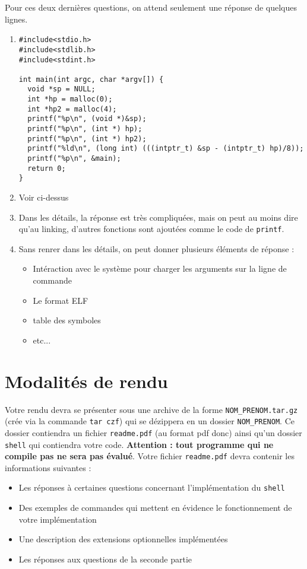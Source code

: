 \documentclass[11pt]{article}
\begin{document}
Pour ces deux dernières questions, on attend seulement une réponse de quelques lignes.
\begin{solution}
  \begin{enumerate}
  \item
    \begin{verbatim}
#include<stdio.h>
#include<stdlib.h>
#include<stdint.h>

int main(int argc, char *argv[]) {
  void *sp = NULL;
  int *hp = malloc(0);
  int *hp2 = malloc(4);
  printf("%p\n", (void *)&sp);
  printf("%p\n", (int *) hp);
  printf("%p\n", (int *) hp2);
  printf("%ld\n", (long int) (((intptr_t) &sp - (intptr_t) hp)/8));
  printf("%p\n", &main);
  return 0;
}
\end{verbatim}
\item Voir ci-dessus
\item Dans les détails, la réponse est très compliquées, mais on peut au moins dire qu'au linking, d'autres fonctions sont ajoutées comme le code de \texttt{printf}.
\item Sans renrer dans les détails, on peut donner plusieurs éléments de réponse :
  \begin{itemize}
  \item Intéraction avec le système pour charger les arguments sur la ligne de commande
  \item Le format ELF
  \item table des symboles
  \item etc...
  \end{itemize}
\end{enumerate}

\end{solution}

\section{Modalités de rendu}

Votre rendu devra se présenter sous une archive de la forme \texttt{NOM\_PRENOM.tar.gz} (crée via la commande \texttt{tar czf}) qui se dézippera en un dossier \texttt{NOM\_PRENOM}. Ce dossier contiendra un fichier \texttt{readme.pdf} (au format pdf donc) ainsi qu'un dossier \texttt{shell} qui contiendra votre code. \textbf{Attention : tout programme qui ne compile pas ne sera pas évalué}. Votre fichier \texttt{readme.pdf} devra contenir les informations suivantes :

\begin{itemize}
\item Les réponses à certaines questions concernant l'implémentation du \texttt{shell}
\item Des exemples de commandes qui mettent en évidence le fonctionnement de votre implémentation
\item Une description des extensions optionnelles implémentées
\item Les réponses aux questions de la seconde partie
\end{itemize}
\end{document}
